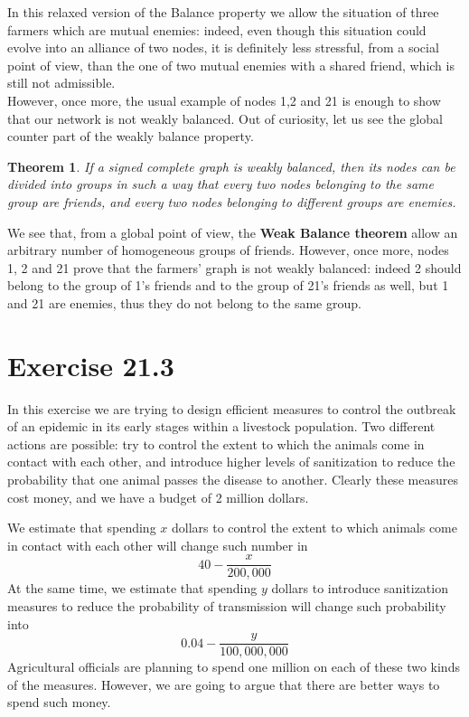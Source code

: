 \documentclass{report}
\newtheorem*{thm}{Theorem}
\theoremstyle{definition}
\theoremstyle{remark}
\begin{document}
In this relaxed version of the Balance property we allow the situation of three farmers which are mutual enemies: indeed, even though this situation could evolve into an alliance of two nodes, it is definitely less stressful, from a social point of view, than the one of two mutual enemies with a shared friend, which is still not admissible.\\
However, once more, the usual example of nodes 1,2 and 21 is enough to show that our network is not weakly balanced. Out of curiosity, let us see the global counter part of the weakly balance property.
\begin{thm}
	If a signed complete graph is weakly balanced, then its nodes can be divided into groups in such a way that every two nodes belonging to the same group are friends, and every two nodes belonging to different groups are enemies. 
\end{thm}
We see that, from a global point of view, the \textbf{Weak Balance theorem} allow an arbitrary number of homogeneous groups of friends. However, once more, nodes 1, 2 and 21 prove that the farmers' graph is not weakly balanced: indeed 2 should belong to the group of 1's friends and to the group of 21's friends as well, but 1 and 21 are enemies, thus they do not belong to the same group.
\newpage

\section*{Exercise 21.3}
In this exercise we are trying to design efficient measures to control the outbreak of an epidemic in its early stages within a livestock  population. Two different actions are possible: try to control the extent to which the
animals come in contact with each other, and introduce higher
levels of sanitization to reduce the probability that one animal passes the disease to another. Clearly these measures cost money, and we have a budget of 2 million dollars. 

We estimate that spending $x$ dollars to control the extent to which animals come in contact with each other will change such number in
\begin{equation*}
40-\frac{x}{200,000}
\end{equation*}
At the same time, we estimate that spending $y$ dollars to introduce sanitization measures to reduce the probability of transmission will change such probability into
\begin{equation*}
0.04-\frac{y}{100,000,000}
\end{equation*}
Agricultural officials are planning to spend one million on each of these two kinds of the measures. However, we are going to argue that there are better ways to spend such money.
\end{document}
